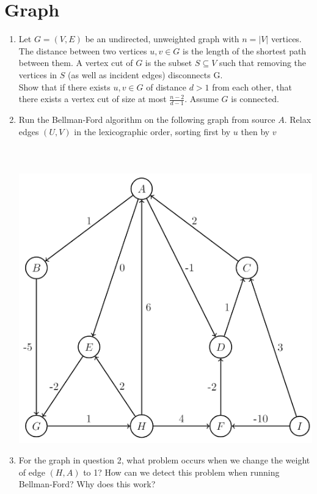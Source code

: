 \documentclass{article}
\begin{document}
\section{Graph}
\doublespacing
\begin{enumerate}
    \item Let $G=(V,E)$ be an undirected, unweighted graph with $n=|V|$ vertices. The distance between two vertices $u,v \in G$ is the length of the shortest path between them. A vertex cut of $G$ is the subset $S \subseteq V$ such that removing the vertices in $S$ (as well as incident edges) disconnects G.\\
    Show that if there exists $u,v \in G$ of distance $d>1$ from each other, that there exists a vertex cut of size at most $\frac{n-2}{d-1}$. Assume $G$ is connected. 
    \newpage

    \item Run the Bellman-Ford algorithm on the following graph from source $A$. Relax edges $(U,V)$ in the lexicographic order, sorting first by $u$ then by $v$
    \\
    \
    \\
        \\
    \
    \\
    \includegraphics[scale=0.7]{image.png}
    \newpage
    \item For the graph in question 2, what problem occurs when we change the weight of edge $(H, A)$ to 1? How can we detect this problem when running Bellman-Ford? Why does this work?
    \newpage
\end{enumerate}
\end{document}
